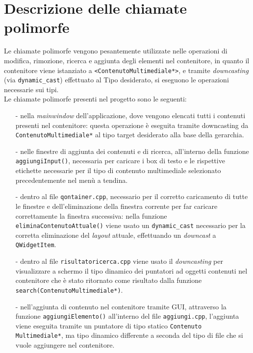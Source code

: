 \documentclass[a4paper,10pt]{article}
\begin{document}
\section{Descrizione delle chiamate polimorfe}
Le chiamate polimorfe vengono pesantemente utilizzate nelle operazioni di modifica, rimozione, ricerca e aggiunta degli elementi nel contenitore, in quanto il contenitore viene istanziato a \texttt{<ContenutoMultimediale*>}, e tramite \textit{downcasting} (via \texttt{dynamic\_cast}) effettuato al Tipo desiderato, si eseguono le operazioni necessarie sui tipi.\\
Le chiamate polimorfe presenti nel progetto sono le seguenti:
\begin{enumerate}
\item[-] nella \textit{mainwindow} dell'applicazione, dove vengono elencati tutti i contenuti presenti nel contenitore: questa operazione è eseguita tramite downcasting da \texttt{ContenutoMultimediale*} al tipo target desiderato alla base della gerarchia.
\item[-] nelle finestre di aggiunta dei contenuti e di ricerca, all'interno della funzione \texttt{aggiungiInput()}, necessaria per caricare i box di testo e le rispettive etichette necessarie per il tipo di contenuto multimediale selezionato precedentemente nel menù a tendina.
\item[-] dentro al file \texttt{qontainer.cpp}, necessario per il corretto caricamento di tutte le finestre e dell'eliminazione della finestra corrente per far caricare correttamente la finestra successiva: nella funzione \texttt{eliminaContenutoAttuale()} viene usato un \texttt{dynamic\_cast} necessario per la corretta eliminazione del \textit{layout} attuale, effettuando un \textit{downcast} a \texttt{QWidgetItem}.
\item[-] dentro al file \texttt{risultatoricerca.cpp} viene usato il \textit{downcasting} per visualizzare a schermo il tipo dinamico dei puntatori ad oggetti contenuti nel contenitore che è stato ritornato come risultato dalla funzione \texttt{search(ContenutoMultimediale*)}.
\item[-] nell'aggiunta di contenuto nel contenitore tramite GUI, attraverso la funzione \texttt{aggiungiElemento()} all'interno del file \texttt{aggiungi.cpp}, l'aggiunta viene eseguita tramite un puntatore di tipo statico \texttt{Contenuto Multimediale*}, ma tipo dinamico differente a seconda del tipo di file che si vuole aggiungere nel contenitore.
\end{enumerate}
\end{document}
